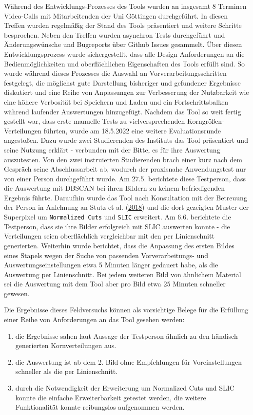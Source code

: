\documentclass[
  12pt,
  openany]{book}
\providecommand{\tightlist}{%
  \setlength{\itemsep}{0pt}\setlength{\parskip}{0pt}}
\begin{document}
Während des Entwicklungs-Prozesses des Tools wurden an insgesamt 8 Terminen Video-Calls mit Mitarbeitenden der Uni Göttingen durchgeführt. In diesen Treffen wurden regelmäßig der Stand des Tools präsentiert und weitere Schritte besprochen. Neben den Treffen wurden asynchron Tests durchgeführt und Änderungswünsche und Bugreports über Github Issues gesammelt.
Über diesen Entwicklungsprozess wurde sichergestellt, dass alle Design-Anforderungen an die Bedienmöglichkeiten und oberflächlichen Eigenschaften des Tools erfüllt sind. So wurde während dieses Prozesses die Auswahl an Vorverarbeitungsschritten festgelegt, die möglichst gute Darstellung bisheriger und gefundener Ergebnisse diskutiert und eine Reihe von Anpassungen zur Verbesserung der Nutzbarkeit wie eine höhere Verbosität bei Speichern und Laden und ein Fortschrittsbalken während laufender Auswertungen hinzugefügt.
Nachdem das Tool so weit fertig gestellt war, dass erste manuelle Tests zu vielversprechenden Korngrößen-Verteilungen führten, wurde am 18.5.2022 eine weitere Evaluationsrunde angestoßen. Dazu wurde zwei Studierenden des Instituts das Tool präsentiert und seine Nutzung erklärt - verbunden mit der Bitte, es für ihre Auswertung auszutesten. Von den zwei instruierten Studierenden brach einer kurz nach dem Gespräch seine Abschlussarbeit ab, wodurch der praxisnahe Anwendungstest nur von einer Person durchgeführt wurde. Am 27.5. berichtete diese Testperson, dass die Auswertung mit DBSCAN bei ihren Bildern zu keinem befriedigenden Ergebnis führte. Daraufhin wurde das Tool nach Konsultation mit der Betreuung der Person in Anlehnung an Stutz et al. (\protect\hyperlink{ref-stutzSuperpixelsEvaluationStateoftheart2018}{2018}) und die dort gezeigten Muster der Superpixel um \texttt{Normalized\ Cuts} und \texttt{SLIC} erweitert.
Am 6.6. berichtete die Testperson, dass sie ihre Bilder erfolgreich mit SLIC auswerten konnte - die Verteilungen seien oberflächlich vergleichbar mit den per Linienschnitt generierten.
Weiterhin wurde berichtet, dass die Anpassung des ersten Bildes eines Stapels wegen der Suche von passenden Vorverarbeitungs- und Auswertungseinstellungen etwa 5 Minuten länger gedauert habe, als die Auswertung per Linienschnitt. Bei jedem weiteren Bild von ähnlichem Material sei die Auswertung mit dem Tool aber pro Bild etwa 25 Minuten schneller gewesen.

Die Ergebnisse dieses Feldversuchs können als vorsichtige Belege für die Erfüllung einer Reihe von Anforderungen an das Tool gesehen werden:

\begin{enumerate}
\def\labelenumi{\arabic{enumi}.}
\tightlist
\item
  die Ergebnisse sahen laut Aussage der Testperson ähnlich zu den händisch generierten Kornverteilungen aus.
\item
  die Auswertung ist ab dem 2. Bild ohne Empfehlungen für Voreinstellungen schneller als die per Linienschnitt.
\item
  durch die Notwendigkeit der Erweiterung um Normalized Cuts und SLIC konnte die einfache Erweiterbarkeit getestet werden, die weitere Funktionalität konnte reibungslos aufgenommen werden.
\end{enumerate}
\end{document}
